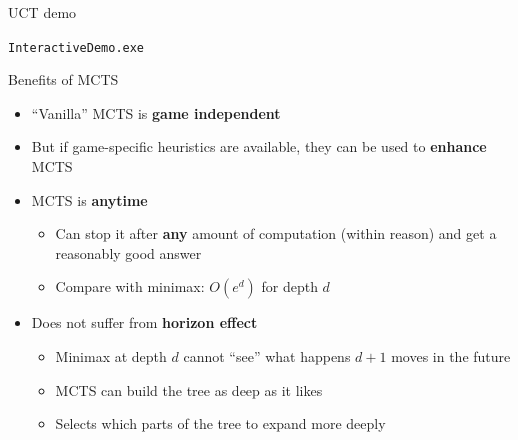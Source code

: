 \begin{frame}{UCT demo}
	\begin{center}
		\texttt{InteractiveDemo.exe}
	\end{center}
\end{frame}

\begin{frame}{Benefits of MCTS}
	\begin{itemize}
		\pause\item ``Vanilla'' MCTS is \textbf{game independent}
		\pause\item But if game-specific heuristics are available, they can be used to \textbf{enhance} MCTS
		\pause\item MCTS is \textbf{anytime}
			\begin{itemize}
				\pause\item Can stop it after \textbf{any} amount of computation (within reason) and get a reasonably good answer
				\pause\item Compare with minimax: $O(e^d)$ for depth $d$
			\end{itemize}
		\pause\item Does not suffer from \textbf{horizon effect}
			\begin{itemize}
				\pause\item Minimax at depth $d$ cannot ``see'' what happens $d+1$ moves in the future
				\pause\item MCTS can build the tree as deep as it likes
				\pause\item Selects which parts of the tree to expand more deeply
			\end{itemize}
	\end{itemize}
\end{frame}

